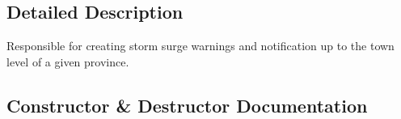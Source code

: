 \subsection{Detailed Description}
\begin{DoxyVerb}Responsible for creating storm surge warnings and notification up to the town level of a given province.\end{DoxyVerb}
 

\subsection{Constructor \& Destructor Documentation}
\hypertarget{classsurgewarnings_1_1_warnings_a1923795bb18f52944d6e6451bdd35b99}{}
